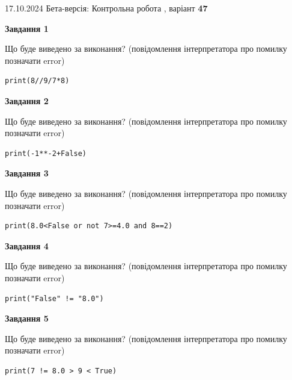 \documentclass[12pt, ukrainian]{article}
\begin{document}
{\Large{17.10.2024 Бета-версія: Контрольна робота , варіант  \No \textbf { 47 }\par}}
{
\begin {large}
{\begin {center}\textbf{Завдання 1}\end {center}}

Що буде виведено за виконання? (повідомлення інтерпретатора про помилку позначати error)\par
\begin{verbatim}
print(8//9/7*8)
\end{verbatim}

{\begin {center}\textbf{Завдання 2}\end {center}}

Що буде виведено за виконання? (повідомлення інтерпретатора про помилку позначати error)\par
\begin{verbatim}
print(-1**-2+False)
\end{verbatim}

{\begin {center}\textbf{Завдання 3}\end {center}}

Що буде виведено за виконання? (повідомлення інтерпретатора про помилку позначати error)\par
\begin{verbatim}
print(8.0<False or not 7>=4.0 and 8==2)
\end{verbatim}

{\begin {center}\textbf{Завдання 4}\end {center}}

Що буде виведено за виконання? (повідомлення інтерпретатора про помилку позначати error)\par
\begin{verbatim}
print("False" != "8.0")
\end{verbatim}

{\begin {center}\textbf{Завдання 5}\end {center}}

Що буде виведено за виконання? (повідомлення інтерпретатора про помилку позначати error)\par
\begin{verbatim}
print(7 != 8.0 > 9 < True)
\end{verbatim}


\end{large}}
\end{document}
